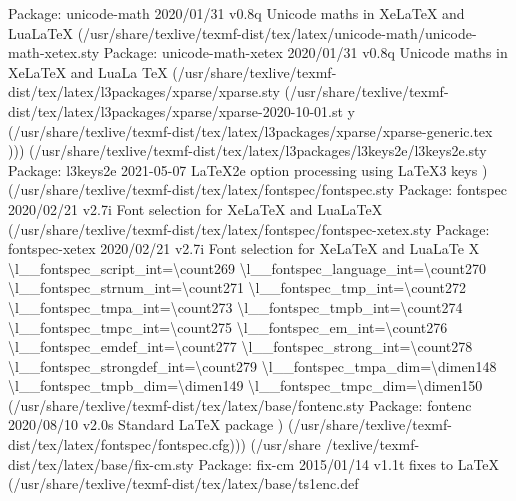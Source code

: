 \documentclass[
  letterpaper,
  DIV=11,
  numbers=noendperiod]{scrartcl}
\newenvironment{Shaded}{\begin{snugshade}}{\end{snugshade}}
\newcommand{\NormalTok}[1]{\textcolor[rgb]{0.00,0.23,0.31}{#1}}
\begin{document}
\begin{Shaded}
\begin{Highlighting}[]
\NormalTok{Package: unicode{-}math 2020/01/31 v0.8q Unicode maths in XeLaTeX and LuaLaTeX}
\NormalTok{(/usr/share/texlive/texmf{-}dist/tex/latex/unicode{-}math/unicode{-}math{-}xetex.sty}
\NormalTok{Package: unicode{-}math{-}xetex 2020/01/31 v0.8q Unicode maths in XeLaTeX and LuaLa}
\NormalTok{TeX}
\NormalTok{(/usr/share/texlive/texmf{-}dist/tex/latex/l3packages/xparse/xparse.sty}
\NormalTok{(/usr/share/texlive/texmf{-}dist/tex/latex/l3packages/xparse/xparse{-}2020{-}10{-}01.st}
\NormalTok{y (/usr/share/texlive/texmf{-}dist/tex/latex/l3packages/xparse/xparse{-}generic.tex}
\NormalTok{))) (/usr/share/texlive/texmf{-}dist/tex/latex/l3packages/l3keys2e/l3keys2e.sty}
\NormalTok{Package: l3keys2e 2021{-}05{-}07 LaTeX2e option processing using LaTeX3 keys}
\NormalTok{) (/usr/share/texlive/texmf{-}dist/tex/latex/fontspec/fontspec.sty}
\NormalTok{Package: fontspec 2020/02/21 v2.7i Font selection for XeLaTeX and LuaLaTeX}
\NormalTok{(/usr/share/texlive/texmf{-}dist/tex/latex/fontspec/fontspec{-}xetex.sty}
\NormalTok{Package: fontspec{-}xetex 2020/02/21 v2.7i Font selection for XeLaTeX and LuaLaTe}
\NormalTok{X}
\NormalTok{\textbackslash{}l\_\_fontspec\_script\_int=\textbackslash{}count269}
\NormalTok{\textbackslash{}l\_\_fontspec\_language\_int=\textbackslash{}count270}
\NormalTok{\textbackslash{}l\_\_fontspec\_strnum\_int=\textbackslash{}count271}
\NormalTok{\textbackslash{}l\_\_fontspec\_tmp\_int=\textbackslash{}count272}
\NormalTok{\textbackslash{}l\_\_fontspec\_tmpa\_int=\textbackslash{}count273}
\NormalTok{\textbackslash{}l\_\_fontspec\_tmpb\_int=\textbackslash{}count274}
\NormalTok{\textbackslash{}l\_\_fontspec\_tmpc\_int=\textbackslash{}count275}
\NormalTok{\textbackslash{}l\_\_fontspec\_em\_int=\textbackslash{}count276}
\NormalTok{\textbackslash{}l\_\_fontspec\_emdef\_int=\textbackslash{}count277}
\NormalTok{\textbackslash{}l\_\_fontspec\_strong\_int=\textbackslash{}count278}
\NormalTok{\textbackslash{}l\_\_fontspec\_strongdef\_int=\textbackslash{}count279}
\NormalTok{\textbackslash{}l\_\_fontspec\_tmpa\_dim=\textbackslash{}dimen148}
\NormalTok{\textbackslash{}l\_\_fontspec\_tmpb\_dim=\textbackslash{}dimen149}
\NormalTok{\textbackslash{}l\_\_fontspec\_tmpc\_dim=\textbackslash{}dimen150}
\NormalTok{(/usr/share/texlive/texmf{-}dist/tex/latex/base/fontenc.sty}
\NormalTok{Package: fontenc 2020/08/10 v2.0s Standard LaTeX package}
\NormalTok{) (/usr/share/texlive/texmf{-}dist/tex/latex/fontspec/fontspec.cfg))) (/usr/share}
\NormalTok{/texlive/texmf{-}dist/tex/latex/base/fix{-}cm.sty}
\NormalTok{Package: fix{-}cm 2015/01/14 v1.1t fixes to LaTeX}
\NormalTok{(/usr/share/texlive/texmf{-}dist/tex/latex/base/ts1enc.def}

\end{Highlighting}
\end{Shaded}
\end{document}
